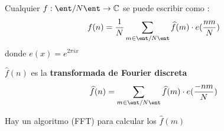 \begin{prop}
	
	Cualquier $f : \ent/N\ent \rightarrow \mathbb{C}$ se puede escribir como :
	$$f(n) = \frac{1}{N}\sum_{m\in \ent/N\ent}\widehat{f}(m)\cdot e(\frac{nm}{N})$$
	donde $e(x) = e^{2\pi ix}$
	
	$\widehat{f}(n)$ es la \textbf{transformada de Fourier discreta}
	$$\widehat{f}(n) = \sum_{m\in \ent/N\ent}\widehat{f}(m)\cdot e(\frac{-nm}{N})$$
	
\end{prop}
\obs Hay un algoritmo (FFT) para calcular los $\widehat{f}(m)$